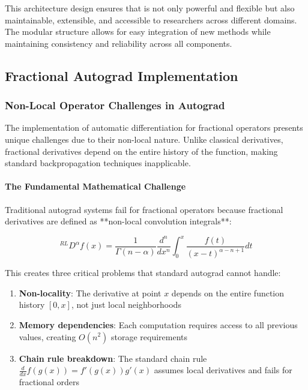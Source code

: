 This architecture design ensures that \hpfracc is not only powerful and flexible but also maintainable, extensible, and accessible to researchers across different domains. The modular structure allows for easy integration of new methods while maintaining consistency and reliability across all components.

\subsection{Fractional Autograd Implementation}

\subsubsection{Non-Local Operator Challenges in Autograd}

The implementation of automatic differentiation for fractional operators presents unique challenges due to their non-local nature. Unlike classical derivatives, fractional derivatives depend on the entire history of the function, making standard backpropagation techniques inapplicable.

\paragraph{The Fundamental Mathematical Challenge}

Traditional autograd systems fail for fractional operators because fractional derivatives are defined as **non-local convolution integrals**:

\begin{equation}
{}^{RL}D^{\alpha}f(x) = \frac{1}{\Gamma(n-\alpha)} \frac{d^n}{dx^n} \int_{0}^{x} \frac{f(t)}{(x-t)^{\alpha-n+1}} dt
\end{equation}

This creates three critical problems that standard autograd cannot handle:

\begin{enumerate}
\item \textbf{Non-locality}: The derivative at point $x$ depends on the entire function history $[0,x]$, not just local neighborhoods
\item \textbf{Memory dependencies}: Each computation requires access to all previous values, creating $O(n^2)$ storage requirements
\item \textbf{Chain rule breakdown}: The standard chain rule $\frac{d}{dx}f(g(x)) = f'(g(x))g'(x)$ assumes local derivatives and fails for fractional orders
\end{enumerate}

